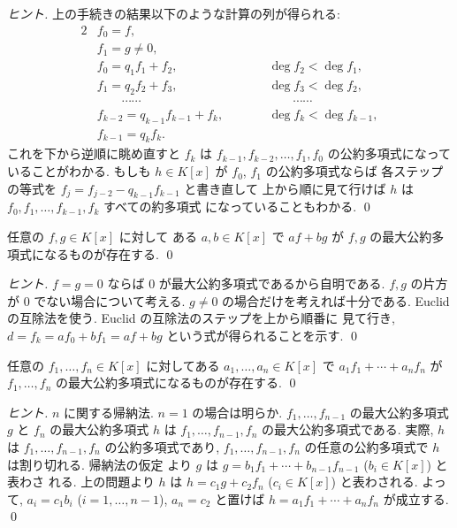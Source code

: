 \documentclass[12pt,twoside]{jarticle}
\begin{document}
\begin{proof}[ヒント]
上の手続きの結果以下のような計算の列が得られる:
\begin{alignat*}{2}
  & f_0 = f, & & \\
  & f_1 = g \ne 0, & & \\
  & f_0 = q_1f_1 + f_2, & \qquad & \deg f_2 < \deg f_1, \\
  & f_1 = q_2f_2 + f_3, & \qquad & \deg f_3 < \deg f_2, \\
  & \qquad \cdots\cdots & \qquad & \qquad\cdots\cdots \\
  & f_{k-2} = q_{k-1}f_{k-1} + f_k, & \qquad & \deg f_k < \deg f_{k-1}, \\
  & f_{k-1} = q_kf_k. & & 
\end{alignat*}
これを下から逆順に眺め直すと $f_k$ は $f_{k-1},f_{k-2},\dots,f_1,f_0$ 
の公約多項式になっていることがわかる.  
もしも $h\in K[x]$ が $f_0$, $f_1$ の公約多項式ならば
各ステップの等式を $f_j = f_{j-2} - q_{k-1}f_{k-1}$ と書き直して
上から順に見て行けば $h$ は $f_0,f_1,\dots,f_{k-1},f_k$ すべての約多項式
になっていることもわかる.
\qed
\end{proof}


\begin{question}[5点]
\label{q:Euclidean-algorithm-2-K[x]}
 任意の $f,g\in K[x]$ に対して
 ある $a,b\in K[x]$ で $af + bg$ が $f,g$ の最大公約多項式になるものが存在する.
 \qed
\end{question}

\begin{proof}[ヒント]
 $f=g=0$ ならば $0$ が最大公約多項式であるから自明である.
 $f,g$ の片方が $0$ でない場合について考える.
 $g\ne 0$ の場合だけを考えれば十分である.
 Euclid の互除法を使う.  Euclid の互除法のステップを上から順番に
 見て行き, $d=f_k=af_0+bf_1=af+bg$ という式が得られることを示す.
 \qed
\end{proof}


\begin{question}[5点]
\label{q:Euclidean-algorithm-3-K[x]}
 任意の $f_1,\ldots,f_n\in K[x]$ に対してある $a_1,\ldots,a_n\in K[x]$ で %
 $a_1f_1 + \cdots + a_nf_n$ が $f_1,\ldots,f_n$ の最大公約多項式になるものが存在する.
 \qed
\end{question}

\begin{proof}[ヒント]
$n$ に関する帰納法.  $n=1$ の場合は明らか. 
$f_1,\dots,f_{n-1}$ の最大公約多項式 $g$ と $f_n$ の最大公約多項式 $h$ 
は $f_1,\dots,f_{n-1},f_n$ の最大公約多項式である. 
実際, $h$ は $f_1,\dots,f_{n-1},f_n$ の公約多項式であり, 
$f_1,\dots,f_{n-1},f_n$ の任意の公約多項式で $h$ は割り切れる.  帰納法の仮定
より $g$ は $g=b_1f_1+\cdots+b_{n-1}f_{n-1}$ ($b_i\in K[x]$) と表わさ
れる. 上の問題より $h$ は $h=c_1g+c_2f_n$ 
($c_i\in K[x]$) と表わされる.  よって, $a_i=c_1b_i$ ($i=1,\dots,n-1$), 
$a_n=c_2$ と置けば $h = a_1f_1+\cdots+a_nf_n$ が成立する.
\qed
\end{proof}
\end{document}
